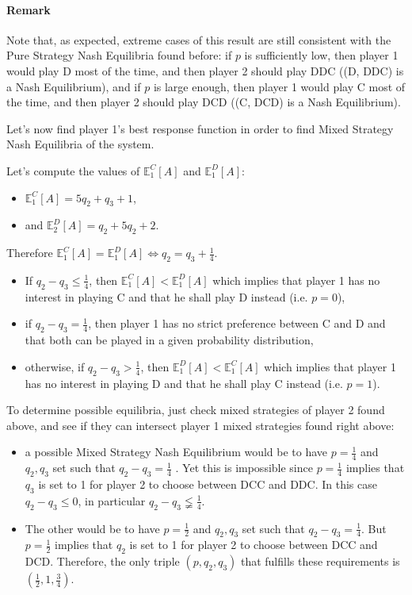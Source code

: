 \documentclass{article}
\newcommand{\E}{\mathbb E}
\begin{document}
\paragraph{Remark} Note that, as expected, extreme cases of this result are still consistent with the Pure Strategy
Nash Equilibria found before: if $p$ is sufficiently low, then player 1 would play D most of the time, and then player 2
should play DDC ((D, DDC) is a Nash Equilibrium), and if $p$ is large enough, then player 1 would play C most of the time,
and then player 2 should play DCD ((C, DCD) is a Nash Equilibrium).

Let's now find player 1's best response function in order to find Mixed Strategy Nash Equilibria of the system.

Let's compute the values of $\E_1^C[A]$ and $\E_1^D[A]$:
\begin{itemize}
	\item $\E_1^C[A] = 5q_2 + q_3 + 1$,
	\item and $\E_2^D[A] = q_2 + 5q_2 + 2$.
\end{itemize}

Therefore $\E_1^C[A] = \E_1^D[A] \iff q_2 = q_3 + \frac 14$.

\begin{itemize}
	\item If $q_2 - q_3 \leq \frac 14$, then $\E_1^C[A] < \E_1^D[A]$ which implies that player 1 has no interest in playing
	C and that he shall play D instead (i.e. $p=0$),
	\item if $q_2 - q_3 = \frac 14$, then player 1 has no strict preference between C and D and that both can be played in
	a given probability distribution,
	\item otherwise, if $q_2-q_3 > \frac 14$, then $\E_1^D[A] < \E_1^C[A]$ which implies that player 1 has no interest in
	playing D and that he shall play C instead (i.e. $p=1$).
\end{itemize}

To determine possible equilibria, just check mixed strategies of player 2 found above, and see if they can intersect
player 1 mixed strategies found right above:
\begin{itemize}
	\item a possible Mixed Strategy Nash Equilibrium would be to have $p = \frac 14$ and $q_2, q_3$ set such that
	$q_2 - q_3 = \frac 14$ . Yet this is impossible since $p = \frac 14$ implies that $q_3$ is set to 1 for player 2
	to choose between DCC and DDC. In this case $q_2 - q_3 \leq 0$, in particular $q_2-q_3 \lneqq \frac 14$.
	\item The other would be to have $p = \frac 12$ and $q_2, q_3$ set such that $q_2-q_3 = \frac 14$. But $p = \frac 12$
	implies that $q_2$ is set to 1 for player 2 to choose between DCC and DCD. Therefore, the only triple $(p, q_2, q_3)$
	that fulfills these requirements is $\left(\frac 12, 1, \frac 34\right)$.
\end{itemize}
\end{document}
